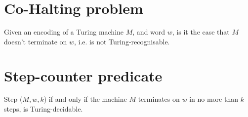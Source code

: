 \documentclass{article}
\begin{document}
\section{Co-Halting problem}
Given an encoding of a Turing machine $M$, and word $w$, is it the case that $M$ doesn't terminate on $w$, i.e. is not Turing-recognisable.

\section{Step-counter predicate}
Step ($M, w, k$) if and only if the machine $M$ terminates on $w$ in no more than $k$ steps, is Turing-decidable.
\end{document}
